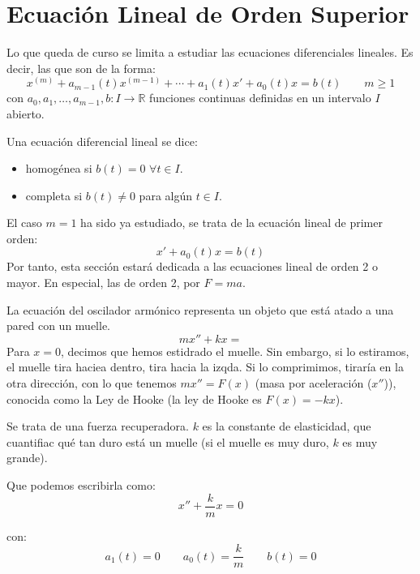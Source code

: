\newpage
\chapter{Ecuación Lineal de Orden Superior}

\noindent
Lo que queda de curso se limita a estudiar las ecuaciones diferenciales lineales. Es decir, las que son de la forma:
\begin{equation}\label{eq:linealsup}
    x^{(m)} + a_{m-1}(t) x^{(m-1)} + \cdots + a_1(t) x' + a_0(t)x = b(t) \qquad m\geq 1
\end{equation}
con $a_0,a_1,\ldots, a_{m-1},b:I\rightarrow\mathbb{R}$ funciones continuas definidas en un intervalo $I$ abierto.


\begin{definicion}
    Una ecuación diferencial lineal se dice: 
    \begin{itemize}
        \item homogénea si $b(t) = 0$ $\forall t\in I$.
        \item completa si $b(t) \neq 0$ para algún $t\in I$.
    \end{itemize}
\end{definicion}

\begin{ejemplo}
    El caso $m=1$ ha sido ya estudiado, se trata de la ecuación lineal de primer orden:
    \begin{equation*}
        x' + a_0(t)x = b(t)
    \end{equation*}
    Por tanto, esta sección estará dedicada a las ecuaciones lineal de orden 2 o mayor. En especial, las de orden 2, por $F=ma$.
\end{ejemplo}

\begin{ejemplo}
    La ecuación del oscilador armónico representa un objeto que está atado a una pared con un muelle. %
    \begin{equation*}
        mx'' + kx = 
    \end{equation*}
    Para $x=0$, decimos que hemos estidrado el muelle. Sin embargo, si lo estiramos, el muelle tira haciea dentro, tira hacia la izqda. Si lo comprimimos, tiraría en la otra dirección, con lo que tenemos $mx'' = F(x)$ (masa por aceleración ($x''$)), conocida como la Ley de Hooke (la ley de Hooke es $F(x)=-kx$).

    Se trata de una fuerza recuperadora. $k$ es la constante de elasticidad, que cuantifiac qué tan duro está un muelle (si el muelle es muy duro, $k$ es muy grande).

    Que podemos escribirla como:
    \begin{equation*}
        x'' + \dfrac{k}{m} x = 0
    \end{equation*}

    con:
    \begin{equation*}
        a_1(t) = 0 \qquad a_0(t) = \dfrac{k}{m}\qquad  b(t) = 0
    \end{equation*}
\end{ejemplo}

